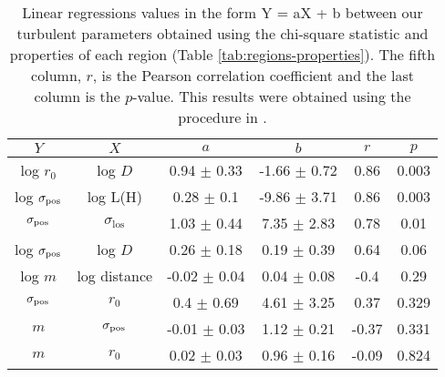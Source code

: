 \begin{table*}
\begin{center}
\caption{Linear regressions values in the form Y = aX + b between our turbulent parameters obtained using the chi-square statistic and properties of each region (Table \ref{tab:regions-properties}). The fifth column, $r$, is the Pearson correlation coefficient and the last column is the $p$-value. This results were obtained using the procedure in \citet{2007ApJ...665.1489K}.}
\begin{tabular}{cccccc}
\hline
            $Y$ &                   $X$ &                 $a$ &                 $b$ &       $r$ &      $p$ \\
\hline
      log $r_0$ &         log $D$ &   0.94 $\pm$ 0.33 &  -1.66 $\pm$ 0.72 &   0.86 &  0.003 \\
   log \(\sigma_{\mathrm{pos}}\) &        log L(H) &    0.28 $\pm$ 0.1 &  -9.86 $\pm$ 3.71 &   0.86 &  0.003 \\
 \(\sigma_{\mathrm{pos}}\) &  $\sigma_{\text{los}}$ &   1.03 $\pm$ 0.44 &   7.35 $\pm$ 2.83 &   0.78 &   0.01 \\
   log \(\sigma_{\mathrm{pos}}\) &         log $D$ &   0.26 $\pm$ 0.18 &   0.19 $\pm$ 0.39 &   0.64 &   0.06 \\
        log $m$ &        log distance &  -0.02 $\pm$ 0.04 &   0.04 $\pm$ 0.08 &   -0.4 &   0.29 \\
       \(\sigma_{\mathrm{pos}}\) &         $r_{0}$ &    0.4 $\pm$ 0.69 &   4.61 $\pm$ 3.25 &   0.37 &  0.329 \\
            $m$ &        \(\sigma_{\mathrm{pos}}\) &  -0.01 $\pm$ 0.03 &   1.12 $\pm$ 0.21 &  -0.37 &  0.331 \\
            $m$ &         $r_{0}$ &   0.02 $\pm$ 0.03 &   0.96 $\pm$ 0.16 &  -0.09 &  0.824 \\
\bottomrule
\end{tabular}\label{tab:RestStats}
\end{center}
\end{table*}


